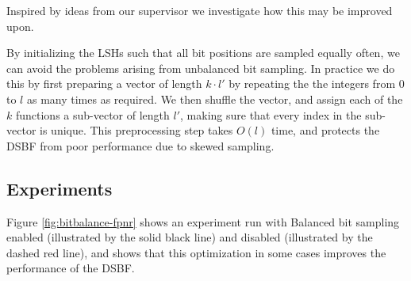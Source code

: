 \documentclass[a4paper,11pt]{article}
\begin{document}
Inspired by ideas from our supervisor we investigate how this may be improved upon.

By initializing the LSHs such that all bit positions are sampled equally often, we can avoid the problems arising from unbalanced bit sampling.
In practice we do this by first preparing a vector of length $k \cdot l'$ by repeating the the integers from 0 to $l$ as many times as required. We then shuffle the vector, and assign each of the $k$ functions a sub-vector of length $l'$, making sure that every index in the sub-vector is unique. This preprocessing step takes $O(l)$ time, and protects the DSBF from poor performance due to skewed sampling.

\subsection{Experiments}
Figure \ref{fig:bitbalance-fpnr} shows an experiment run with Balanced bit sampling enabled (illustrated by the solid black line) and disabled (illustrated by the dashed red line), and shows that this optimization in some cases improves the performance of the DSBF.
\end{document}

